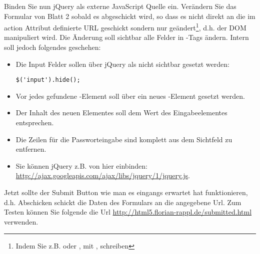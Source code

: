 %
\par Binden Sie nun jQuery als externe JavaScript Quelle ein. Verändern Sie das Formular von Blatt 2 sobald es abgeschickt wird, so dass es nicht direkt an die im action Attribut definierte URL geschickt sondern nur geändert\footnote{Indem Sie z.B.  oder , mit , schreiben}, d.h. der DOM manipuliert wird. Die Änderung soll sichtbar alle  Felder in -Tags ändern. Intern soll jedoch folgendes geschehen:
%
\begin{itemize}
\item Die Input Felder sollen über jQuery als nicht sichtbar gesetzt werden:
%
\begin{lstlisting}
$('input').hide();
\end{lstlisting}
%
\item Vor jedes gefundene -Element soll über  ein neues -Element gesetzt werden.
\item Der Inhalt des neuen Elementes soll dem Wert des Eingabeelementes entsprechen.
\item Die Zeilen für die Passworteingabe sind komplett aus dem Sichtfeld zu entfernen.
\item Sie können jQuery z.B. von hier einbinden: \url{http://ajax.googleapis.com/ajax/libs/jquery/1/jquery.js}.
\end{itemize}
%
\par Jetzt sollte der Submit Button wie man es eingangs erwartet hat funktionieren, d.h. Abschicken schickt die Daten des Formulars an die angegebene Url. Zum Testen können Sie folgende die Url \url{http://html5.florian-rappl.de/submitted.html} verwenden.